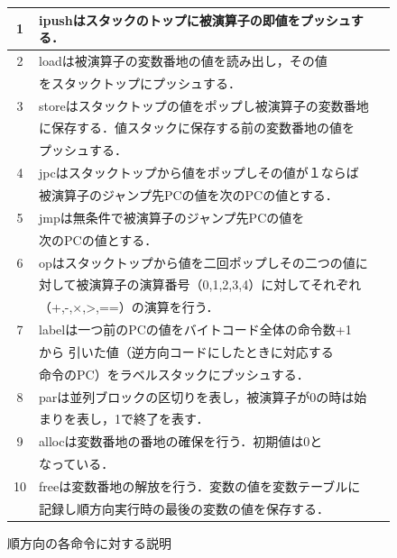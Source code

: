 \documentclass[submit,PRO]{ipsj}
\begin{document}
\begin{figure}[tb]
\caption{順方向の各命令に対する説明}
\label{tab:expfor}
\begin{center}
\begin{tabular}[t]{|c|l|}\hline
1 &ipushはスタックのトップに被演算子の即値をプッシュする． \\\hline

2 & loadは被演算子の変数番地の値を読み出し，その値\\

& をスタックトップにプッシュする．\\\hline

3& storeはスタックトップの値をポップし被演算子の変数番地\\ 

& に保存する．値スタックに保存する前の変数番地の値を\\ &プッシュする．\\\hline

4 &jpcはスタックトップから値をポップしその値が１ならば\\ & 被演算子のジャンプ先PCの値を次のPCの値とする． \\\hline

5& jmpは無条件で被演算子のジャンプ先PCの値を\\ & 次のPCの値とする．\\\hline



6& opはスタックトップから値を二回ポップしその二つの値に\\ &対して被演算子の演算番号（0,1,2,3,4）に対してそれぞれ\\ &（+,-,$\times$,>,==）の演算を行う．\\\hline


7& labelは一つ前のPCの値をバイトコード全体の命令数+1\\ &から 引いた値（逆方向コードにしたときに対応する\\ &命令のPC）をラベルスタックにプッシュする．\\\hline


8& parは並列ブロックの区切りを表し，被演算子が0の時は始\\ &まりを表し，1で終了を表す．\\\hline


9& allocは変数番地の番地の確保を行う．初期値は0と\\ &なっている．\\\hline

10& freeは変数番地の解放を行う．変数の値を変数テーブルに\\ &記録し順方向実行時の最後の変数の値を保存する．\\\hline


\end{tabular}
\end{center}
\end{figure}
\end{document}
